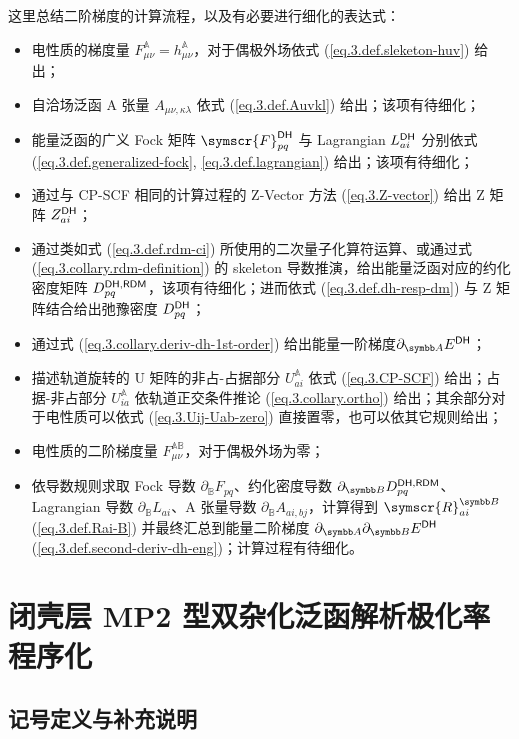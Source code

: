 这里总结二阶梯度的计算流程，以及有必要进行细化的表达式：
\begin{itemize}[nosep]
    \item 电性质的梯度量 $F_{\mu \nu}^\mathbb{A} = h_{\mu \nu}^\mathbb{A}$，对于偶极外场依式 (\ref{eq.3.def.sleketon-huv}) 给出；
    \item 自洽场泛函 A 张量 $A_{\mu \nu, \kappa \lambda}$ 依式 (\ref{eq.3.def.Auvkl}) 给出；该项有待细化；
    \item 能量泛函的广义 Fock 矩阵 $\symscr{F}_{pq}^\textmt{DH}$ 与 Lagrangian $L_{ai}^{\textsf{DH}}$ 分别依式 (\ref{eq.3.def.generalized-fock}, \ref{eq.3.def.lagrangian}) 给出；该项有待细化；
    \item 通过与 CP-SCF 相同的计算过程的 Z-Vector 方法 (\ref{eq.3.Z-vector}) 给出 Z 矩阵 $Z_{ai}^{\textsf{DH}}$；
    \item 通过类如式 (\ref{eq.3.def.rdm-ci}) 所使用的二次量子化算符运算、或通过式 (\ref{eq.3.collary.rdm-definition}) 的 skeleton 导数推演，给出能量泛函对应的约化密度矩阵 $D_{pq}^{\textsf{DH}, \textsf{RDM}}$，该项有待细化；进而依式 (\ref{eq.3.def.dh-resp-dm}) 与 Z 矩阵结合给出弛豫密度 $D_{pq}^{\textsf{DH}}$；
    \item 通过式 (\ref{eq.3.collary.deriv-dh-1st-order}) 给出能量一阶梯度$\partial_\mathbb{A} E^\textmt{DH}$；
    \item 描述轨道旋转的 U 矩阵的非占-占据部分 $U_{ai}^\mathbb{A}$ 依式 (\ref{eq.3.CP-SCF}) 给出；占据-非占部分 $U_{ia}^\mathbb{A}$ 依轨道正交条件推论 (\ref{eq.3.collary.ortho}) 给出；其余部分对于电性质可以依式 (\ref{eq.3.Uij-Uab-zero}) 直接置零，也可以依其它规则给出；
    \item 电性质的二阶梯度量 $F_{\mu \nu}^\mathbb{AB}$，对于偶极外场为零；
    \item 依导数规则求取 Fock 导数 $\partial_\mathbb{B} F_{pq}$、约化密度导数 $\partial_\mathbb{B} D_{pq}^{\textmt{DH}, \textmt{RDM}}$、Lagrangian 导数 $\partial_\mathbb{B} L_{ai}$、A 张量导数 $\partial_\mathbb{B} A_{ai, bj}$，计算得到 $\symscr{R}_{ai}^\mathbb{B}$ (\ref{eq.3.def.Rai-B}) 并最终汇总到能量二阶梯度 $\partial_\mathbb{A} \partial_\mathbb{B} E^\textmt{DH}$ (\ref{eq.3.def.second-deriv-dh-eng})；计算过程有待细化。
\end{itemize}

\section{闭壳层 MP2 型双杂化泛函解析极化率程序化}
\label{sec.3.program}

\subsection{记号定义与补充说明}

